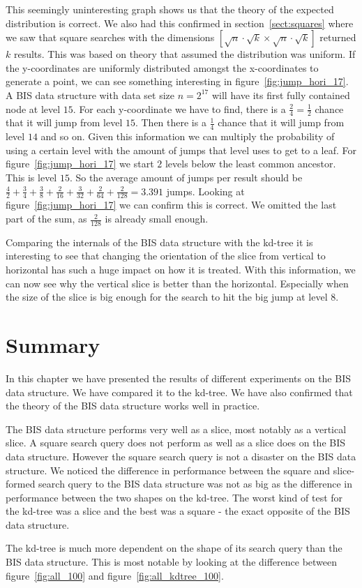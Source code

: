 This seemingly uninteresting graph shows us that the theory of the expected distribution is correct. We also had this confirmed in section~\ref{sect:squares} where we saw that square searches with the dimensions $[\sqrt{n}\cdot\sqrt{k} \times \sqrt{n}\cdot\sqrt{k}]$ returned $k$ results. This was based on theory that assumed the distribution was uniform. If the y-coordinates are uniformly distributed amongst the x-coordinates to generate a point, we can see something interesting in figure~\ref{fig:jump_hori_17}. A BIS data structure with data set size $n = 2^{17}$ will have its first fully contained node at level $15$. For each y-coordinate we have to find, there is a $\frac{2}{4} = \frac{1}{2}$ chance that it will jump from level $15$. Then there is a $\frac{1}{4}$ chance that it will jump from level $14$ and so on. Given this information we can multiply the probability of using a certain level with the amount of jumps that level uses to get to a leaf. For figure~\ref{fig:jump_hori_17} we start $2$ levels below the least common ancestor. This is level $15$. So the average amount of jumps per result should be $\frac{4}{2} + \frac{3}{4} + \frac{3}{8} + \frac{2}{16} + \frac{3}{32} + \frac{2}{64} + \frac{2}{128} = 3.391$ jumps. Looking at figure~\ref{fig:jump_hori_17} we can confirm this is correct. We omitted the last part of the sum, as $\frac{2}{128}$ is already small enough.

Comparing the internals of the BIS data structure with the kd-tree it is interesting to see that changing the orientation of the slice from vertical to horizontal has such a huge impact on how it is treated. With this information, we can now see why the vertical slice is better than the horizontal. Especially when the size of the slice is big enough for the search to hit the big jump at level $8$.

\section{Summary}

In this chapter we have presented the results of different experiments on the BIS data structure. We have compared it to the kd-tree. We have also confirmed that the theory of the BIS data structure works well in practice.

The BIS data structure performs very well as a slice, most notably as a vertical slice. A square search query does not perform as well as a slice does on the BIS data structure. However the square search query is not a disaster on the BIS data structure. We noticed the difference in performance between the square and slice-formed search query to the BIS data structure was not as big as the difference in performance between the two shapes on the kd-tree. The worst kind of test for the kd-tree was a slice and the best was a square - the exact opposite of the BIS data structure. 

The kd-tree is much more dependent on the shape of its search query than the BIS data structure. This is most notable by looking at the difference between figure~\ref{fig:all_100} and figure~\ref{fig:all_kdtree_100}.

